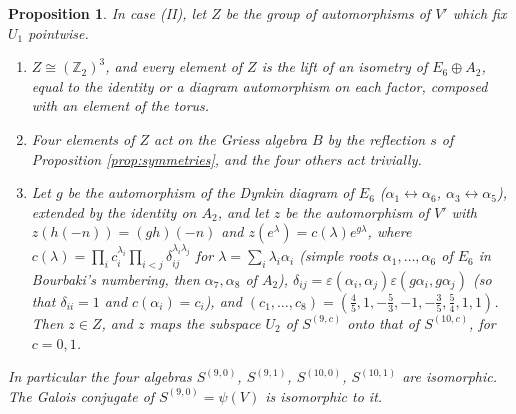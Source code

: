 \documentclass[leqno]{article}
\newcommand{\Z}{\ensuremath{\mathbb{Z}}}
\newcommand{\epsi}{\varepsilon}
\newtheorem{prop}[thm]{Proposition}
\numberwithin{equation}{section}
\begin{document}
\begin{prop}
\label{prop:centralizer-two}
In case (II), let $Z$ be the group of automorphisms of $V'$ which fix $U_1$ pointwise.
\begin{enumerate}
\item $Z \cong (\Z_2)^3$, and every element of $Z$ is the lift of an isometry of $E_6 \oplus A_2$, equal to the identity or a diagram automorphism on each factor, composed with an element of the torus.
\item Four elements of $Z$ act on the Griess algebra $B$ by the reflection $s$ of Proposition \ref{prop:symmetries}, and the four others act trivially.
\item Let $g$ be the automorphism of the Dynkin diagram of $E_6$ ($\alpha_1 \leftrightarrow \alpha_6$, $\alpha_3 \leftrightarrow \alpha_5$), extended by the identity on $A_2$, and let $z$ be the automorphism of $V'$ with $z(h(-n)) = (gh)(-n)$ and $z(e^\lambda) = c(\lambda)e^{g\lambda}$, where $c(\lambda) = \prod_i c_i^{\lambda_i}\prod_{i<j}\delta_{ij}^{\lambda_i\lambda_j}$ for $\lambda = \sum_i\lambda_i\alpha_i$ (simple roots $\alpha_1, \ldots, \alpha_6$ of $E_6$ in Bourbaki's numbering, then $\alpha_7, \alpha_8$ of $A_2$), $\delta_{ij} = \epsi(\alpha_i,\alpha_j)\epsi(g\alpha_i,g\alpha_j)$ (so that $\delta_{ii} = 1$ and $c(\alpha_i) = c_i$), and $(c_1,\ldots,c_8) = (\frac45, 1, -\frac53, -1, -\frac35, \frac54, 1, 1)$. Then $z \in Z$, and $z$ maps the subspace $U_2$ of $S^{(9,c)}$ onto that of $S^{(10,c)}$, for $c = 0, 1$.
\end{enumerate}
In particular the four algebras $S^{(9,0)}$, $S^{(9,1)}$, $S^{(10,0)}$, $S^{(10,1)}$ are isomorphic. The Galois conjugate of $S^{(9,0)} = \psi(V)$ is isomorphic to it.
\end{prop}
\end{document}
